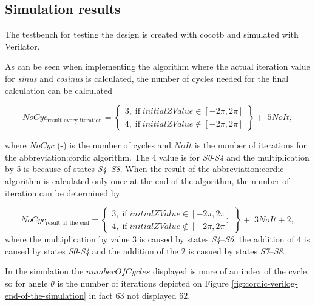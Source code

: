 \documentclass[a4paper, twoside, 11pt]{article}
\begin{document}
    \subsection{Simulation results}
    The testbench for testing the design is created with cocotb and simulated with Verilator.\par
    As can be seen when implementing the algorithm where the actual iteration value for \textit{sinus} and \textit{cosinus} is calculated, the number of cycles needed for the final calculation can be calculated

    \begin{equation}
                NoCyc_\text{result every iteration} = 
                \left\{
                \begin{array}{lr}
                    3,\;\text{if}\;initialZValue \in [-2 \pi, 2 \pi]\\
                    4,\;\text{if}\;initialZValue \notin [-2 \pi, 2 \pi]
                \end{array}
                \right\}
         + \;5 NoIt,
    \end{equation}

    where $NoCyc$ (-) is the number of cycles and $NoIt$ is the number of iterations for the \gls{abbreviation:cordic} algorithm. The $4$ value is for \textit{S0}-\textit{S4} and the multiplication by 5 is because of states \textit{S4}–\textit{S8}. When the result of the \gls{abbreviation:cordic} algorithm is calculated only once at the end of the algorithm, the number of iteration can be determined by

    \begin{equation}
        NoCyc_\text{result at the end} = 
                \left\{
                \begin{array}{lr}
                    3,\;\text{if}\;initialZValue \in [-2 \pi, 2 \pi]\\
                    4,\;\text{if}\;initialZValue \notin [-2 \pi, 2 \pi]
                \end{array}
                \right\}
            +\;3 NoIt + 2,
    \end{equation}
    where the multiplication by value 3 is caused by states \textit{S4}–\textit{S6}, the addition of $4$ is caused by states \textit{S0}-\textit{S4} and the addition of the $2$ is casued by states \textit{S7}–\textit{S8}.\par
    \par
    In the simulation the $numberOfCycles$ displayed is more of an index of the cycle, so for angle $\theta$ is the number of iterations depicted on Figure \ref{fig:cordic-verilog-end-of-the-simulation} in fact $63$ not displayed $62$.
\end{document}
